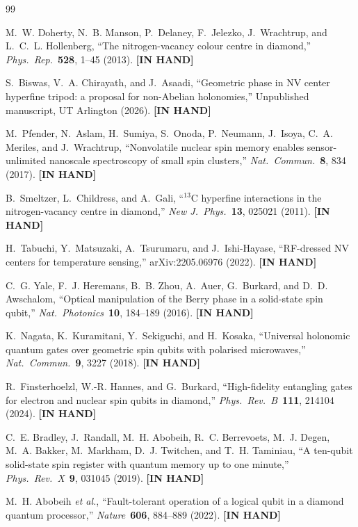 \documentclass[11pt,letterpaper]{article}
\newcommand{\inhand}{\textcolor{green!50!black}{\textbf{[IN HAND]}}}
\begin{document}
\begin{thebibliography}{99}

M.~W. Doherty, N.~B. Manson, P.~Delaney, F.~Jelezko, J.~Wrachtrup, and L.~C.~L. Hollenberg,
``The nitrogen-vacancy colour centre in diamond,''
\textit{Phys.\ Rep.}\ \textbf{528}, 1--45 (2013). \inhand

S.~Biswas, V.~A. Chirayath, and J.~Asaadi,
``Geometric phase in NV center hyperfine tripod: a proposal for non-Abelian holonomies,''
Unpublished manuscript, UT Arlington (2026). \inhand

M.~Pfender, N.~Aslam, H.~Sumiya, S.~Onoda, P.~Neumann, J.~Isoya, C.~A. Meriles, and J.~Wrachtrup,
``Nonvolatile nuclear spin memory enables sensor-unlimited nanoscale spectroscopy of small spin clusters,''
\textit{Nat.\ Commun.}\ \textbf{8}, 834 (2017). \inhand

B.~Smeltzer, L.~Childress, and A.~Gali,
``$^{13}$C hyperfine interactions in the nitrogen-vacancy centre in diamond,''
\textit{New J.\ Phys.}\ \textbf{13}, 025021 (2011). \inhand

H.~Tabuchi, Y.~Matsuzaki, A.~Tsurumaru, and J.~Ishi-Hayase,
``RF-dressed NV centers for temperature sensing,''
arXiv:2205.06976 (2022). \inhand

C.~G. Yale, F.~J. Heremans, B.~B. Zhou, A.~Auer, G.~Burkard, and D.~D. Awschalom,
``Optical manipulation of the Berry phase in a solid-state spin qubit,''
\textit{Nat.\ Photonics}\ \textbf{10}, 184--189 (2016). \inhand

K.~Nagata, K.~Kuramitani, Y.~Sekiguchi, and H.~Kosaka,
``Universal holonomic quantum gates over geometric spin qubits with polarised microwaves,''
\textit{Nat.\ Commun.}\ \textbf{9}, 3227 (2018). \inhand

R.~Finsterhoelzl, W.-R. Hannes, and G.~Burkard,
``High-fidelity entangling gates for electron and nuclear spin qubits in diamond,''
\textit{Phys.\ Rev.\ B}\ \textbf{111}, 214104 (2024). \inhand

C.~E. Bradley, J.~Randall, M.~H. Abobeih, R.~C. Berrevoets, M.~J. Degen, M.~A. Bakker, M.~Markham, D.~J. Twitchen, and T.~H. Taminiau,
``A ten-qubit solid-state spin register with quantum memory up to one minute,''
\textit{Phys.\ Rev.\ X}\ \textbf{9}, 031045 (2019). \inhand

M.~H. Abobeih \textit{et al.},
``Fault-tolerant operation of a logical qubit in a diamond quantum processor,''
\textit{Nature}\ \textbf{606}, 884--889 (2022). \inhand


\end{thebibliography}
\end{document}
